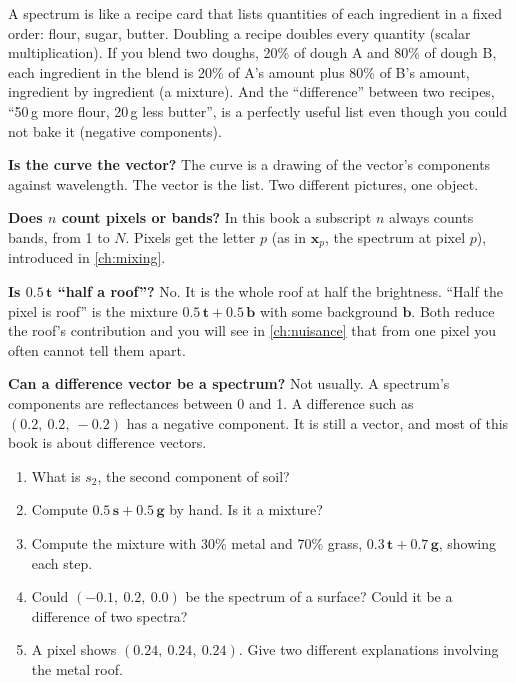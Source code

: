 \documentclass[11pt,a4paper,oneside,openany]{book}
\newcommand{\B}[1]{{\symbf{#1}}}
\newcommand{\B}[1]{{\bm{#1}}}
\newcommand{\vx}{\B{x}}
\newcommand{\vt}{\B{t}}
\newcommand{\vb}{\B{b}}
\newcommand{\vg}{\B{g}}
\newcommand{\vs}{\B{s}}
\begin{document}
\begin{analogy}
A spectrum is like a recipe card that lists quantities of each ingredient in a fixed order: flour, sugar, butter.
Doubling a recipe doubles every quantity (scalar multiplication). If you blend two doughs, 20\% of dough A and 80\% of
dough B, each ingredient in the blend is 20\% of A's amount plus 80\% of B's amount, ingredient by ingredient (a
mixture). And the ``difference'' between two recipes, ``50\,g more flour, 20\,g less butter'', is a perfectly useful
list even though you could not bake it (negative components).
\end{analogy}

\begin{confusions}
\textbf{Is the curve the vector?} The curve is a drawing of the vector's components against wavelength. The vector is the
list. Two different pictures, one object.

\textbf{Does $n$ count pixels or bands?} In this book a subscript $n$ always counts bands, from 1 to $N$. Pixels get
the letter $p$ (as in $\vx_p$, the spectrum at pixel $p$), introduced in \cref{ch:mixing}.

\textbf{Is $0.5\,\vt$ ``half a roof''?} No. It is the whole roof at half the brightness. ``Half the pixel is roof'' is the
mixture $0.5\,\vt+0.5\,\vb$ with some background $\vb$. Both reduce the roof's contribution and you will see in
\cref{ch:nuisance} that from one pixel you often cannot tell them apart.

\textbf{Can a difference vector be a spectrum?} Not usually. A spectrum's components are reflectances between 0 and 1. A
difference such as $(0.2,\ 0.2,\ -0.2)$ has a negative component. It is still a vector, and most of this book is about
difference vectors.
\end{confusions}

\begin{checkyourself}
\begin{enumerate}
\item What is $s_2$, the second component of soil?
\item Compute $0.5\,\vs+0.5\,\vg$ by hand. Is it a mixture?
\item Compute the mixture with 30\% metal and 70\% grass, $0.3\,\vt+0.7\,\vg$, showing each step.
\item Could $(-0.1,\ 0.2,\ 0.0)$ be the spectrum of a surface? Could it be a difference of two spectra?
\item A pixel shows $(0.24,\ 0.24,\ 0.24)$. Give two different explanations involving the metal roof.
\end{enumerate}
\end{checkyourself}
\end{document}
